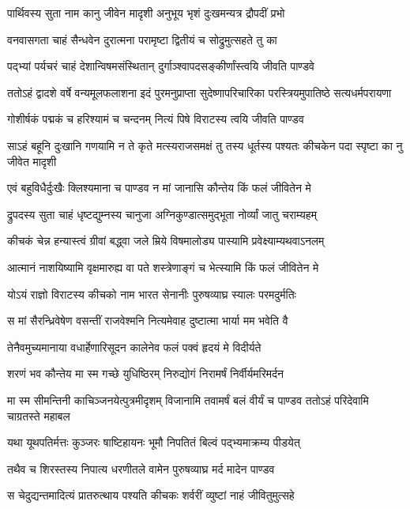 \twolineshloka
{पार्थिवस्य सुता नाम कानु जीवेन मादृशी}
{अनुभूय भृशं दुःखमन्यत्र द्रौपदीं प्रभो}


\twolineshloka
{वनवासगता चाहं सैन्धवेन दुरात्मना}
{परामृष्टा द्वितीयं च सोद्रुमुत्सहते तु का}


\twolineshloka
{पद्भ्यां पर्यचरं चाहं देशान्विषमसंस्थितान्}
{दुर्गाञ्श्वापदसङ्कीर्णांस्त्वयि जीवति पाण्डवे}


\threelineshloka
{ततोऽहं द्वादशे वर्षे वन्यमूलफलाशना}
{इदं पुरमनुप्राप्ता सुदेष्णापरिचारिका}
{परस्त्रियमुपातिष्ठे सत्यधर्मपरायणा}


\twolineshloka
{गोशीर्षकं पद्मकं च हरिश्यामं च चन्दनम्}
{नित्यं पिषे विराटस्य त्वयि जीवति पाण्डव}


\onelineshloka
{साऽहं बहूनि दुःखानि गणयामि न ते कृते}
\twolineshloka
{मत्स्यराजसमक्षं तु तस्य धूर्तस्य पश्यतः}
{कीचकेन पदा स्पृष्टा का नु जीवेत मादृशी}


\twolineshloka
{एवं बहुविधैर्दुःखैः क्लिश्यमाना च पाण्डव}
{न मां जानासि कौन्तेय किं फलं जीवितेन मे}


\twolineshloka
{द्रुपदस्य सुता चाहं धृष्टद्युम्नस्य चानुजा}
{अग्निकुण्डात्समुद्भूता नोर्व्यां जातु चराम्यहम्}


\twolineshloka
{कीचकं चेन्न हन्यास्त्वं ग्रीवां बद्ध्वा जले म्रिये}
{विषमालोड्य पास्यामि प्रवेक्ष्याम्यथवाऽनलम्}


\twolineshloka
{आत्मानं नाशयिष्यामि वृक्षमारुह्य वा पते}
{शस्त्रेणाङ्गं च भेत्स्यामि किं फलं जीवितेन मे}


\twolineshloka
{योऽयं राज्ञो विराटस्य कीचको नाम भारत}
{सेनानीः पुरुषव्याघ्र स्यालः परमदुर्मतिः}


\twolineshloka
{स मां सैरन्ध्रिवेषेण वसन्तीं राजवेश्मनि}
{नित्यमेवाह दुष्टात्मा भार्या मम भवेति वै}


\twolineshloka
{तेनैवमुच्यमानाया वधार्हेणारिसूदन}
{कालेनेव फलं पक्वं हृदयं मे विदीर्यते}


\twolineshloka
{शरणं भव कौन्तेय मा स्म गच्छे युधिष्ठिरम्}
{निरुद्योगं निरामर्षं निर्वीर्यमरिमर्दन}


\onelineshloka
{मा स्म सीमन्तिनी काचिञ्जनयेत्पुत्रमीदृशम्}
\twolineshloka
{विजानामि तवामर्षं बलं वीर्यं च पाण्डव}
{ततोऽहं परिदेवामि चाग्रतस्ते महाबल}


\twolineshloka
{यथा यूथपतिर्मत्तः कुञ्जरः षाष्टिहायनः}
{भूमौ निपतितं बिल्वं पद्भ्यमाक्रम्य पीडयेत्}


\twolineshloka
{तथैव च शिरस्तस्य निपात्य धरणीतले}
{वामेन पुरुषव्याघ्र मर्द मादेन पाण्डव}


\twolineshloka
{स चेदुद्यन्तमादित्यं प्रातरुत्थाय पश्यति}
{कीचकः शर्वरीं व्युष्टां नाहं जीवितुमुत्सहे}


